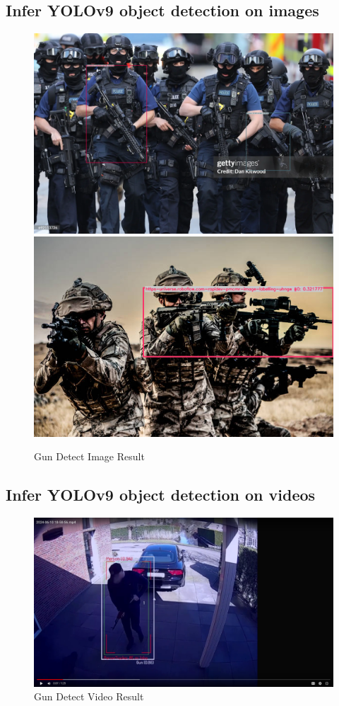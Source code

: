     \subsection{Infer YOLOv9 object detection on images}
        \begin{figure}[H]
            \centering
                \includegraphics[width=0.8\linewidth]{img/gun_detect.png}
            \endminipage\hfill
                \includegraphics[width=0.8\linewidth]{img/gun_detect_result.png}
            \endminipage\hfill
            \caption{Gun Detect Image Result}
            \label{fig:image-result}
        \end{figure}
    \subsection{Infer YOLOv9 object detection on videos}
        \begin{figure}[H]
            \centering
            \includegraphics[width=0.8\linewidth]{img/result_data.png}
            \caption{Gun Detect Video Result}
            \label{fig:video-result}
        \end{figure}